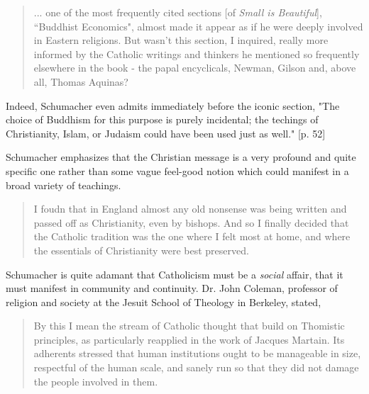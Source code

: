 \documentclass[letterpaper]{article}
\begin{document}
\begin{quote}
... one of the most frequently cited sections [of \textit{Small is Beautiful}], ``Buddhist Economics", almost made it appear as if he were deeply involved in Eastern religions. But wasn't this section, I inquired, really more informed by the Catholic writings and thinkers he mentioned so frequently elsewhere in the book - the papal encyclicals, Newman, Gilson and, above all, Thomas Aquinas?
\end{quote}

Indeed, Schumacher even admits immediately before the iconic section, "The choice of Buddhism for this purpose is purely incidental; the techings of Christianity, Islam, or Judaism could have been used just as well." [p. 52]


Schumacher emphasizes that the Christian message is a very profound and quite specific one rather than some vague feel-good notion which could manifest in a broad variety of teachings.

\begin{quote}
I foudn that in England almost any old nonsense was being written and passed off as Christianity, even by bishops. And so I finally decided that the Catholic tradition was the one where I felt most at home, and where the essentials of Christianity were best preserved.
\end{quote}

Schumacher is quite adamant that Catholicism must be a \textit{social} affair, that it must manifest in community and continuity. Dr. John Coleman, professor of religion and society at the Jesuit School of Theology in Berkeley, stated,

\begin{quote}
By this I mean the stream of Catholic thought that build on Thomistic principles, as particularly reapplied in the work of Jacques Martain. Its adherents stressed that human institutions ought to be manageable in size, respectful of the human scale, and sanely run so that they did not damage the people involved in them.
\end{quote}
\end{document}

